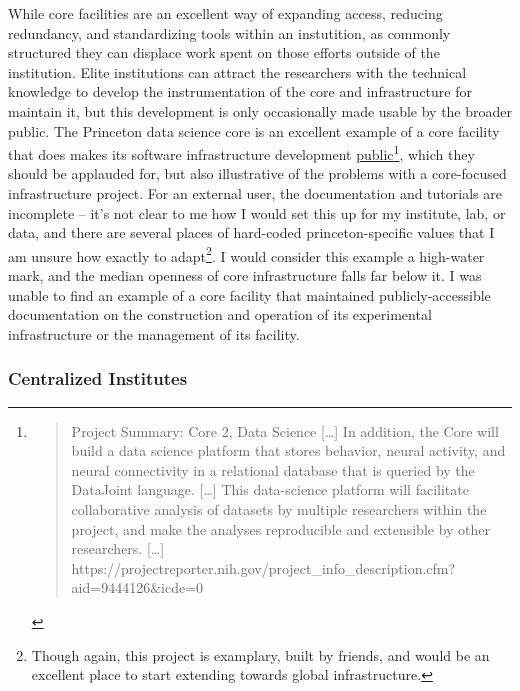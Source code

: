 \documentclass[10pt]{article}
\begin{document}
\begin{multicols}{2}
While core facilities are an excellent way of expanding access, reducing
redundancy, and standardizing tools within an instutition, as commonly
structured they can displace work spent on those efforts outside of the
institution. Elite institutions can attract the researchers with the
technical knowledge to develop the instrumentation of the core and
infrastructure for maintain it, but this development is only
occasionally made usable by the broader public. The Princeton data
science core is an excellent example of a core facility that does makes
its software infrastructure development
\href{https://github.com/BrainCOGS}{public}\footnote{\begin{quote}
  Project Summary: Core 2, Data Science {[}\ldots{]} In addition, the
  Core will build a data science platform that stores behavior, neural
  activity, and neural connectivity in a relational database that is
  queried by the DataJoint language. {[}\ldots{]} This data-science
  platform will facilitate collaborative analysis of datasets by
  multiple researchers within the project, and make the analyses
  reproducible and extensible by other researchers. {[}\ldots{]}
  https://projectreporter.nih.gov/project\_info\_description.cfm?aid=9444126\&icde=0
  \end{quote}}, which they should be applauded for, but also
illustrative of the problems with a core-focused infrastructure project.
For an external user, the documentation and tutorials are incomplete --
it's not clear to me how I would set this up for my institute, lab, or
data, and there are several places of hard-coded princeton-specific
values that I am unsure how exactly to adapt\footnote{Though again, this
  project is examplary, built by friends, and would be an excellent
  place to start extending towards global infrastructure.}. I would
consider this example a high-water mark, and the median openness of core
infrastructure falls far below it. I was unable to find an example of a
core facility that maintained publicly-accessible documentation on the
construction and operation of its experimental infrastructure or the
management of its facility.

\hypertarget{centralized-institutes}{%
\subsubsection{Centralized Institutes}\label{centralized-institutes}}


\end{multicols}
\end{document}
